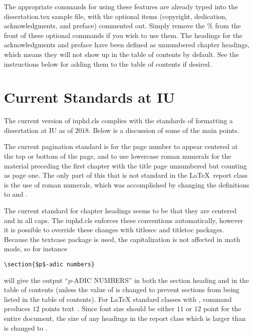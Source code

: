 The appropriate commands for using these features are already typed into the dissertation.tex sample file,
with the optional items (copyright, dedication, acknowledgments, and preface) commented out.  Simply remove the \% from the front
of these optional commands if you wish to use them.  The headings for the acknowledgments and preface have
been defined as unnumbered chapter headings, which means they will not show up in the table of contents by default.
See the instructions below for adding them to the table of contents if desired.

\section{Current Standards at IU}
The current version of iuphd.cls complies with the standards of formatting a dissertation at IU as of $2018$.  Below is a discussion of
some of the main points.

The current pagination standard is for the page number to appear centered at the top or bottom of the
page, and to use lowercase roman numerals for the material preceding the first chapter with the title page unnumbered but counting as
page one. The only part of this that is not standard in the \LaTeX \ report class is the use of roman numerals, which was accomplished
by changing the definitions to  and .

The current standard for chapter headings seems to be that they are centered and in all caps.  The iuphd.cls enforces these
conventions automatically, however it is possible to override these changes with
titlesec and titletoc packages. Because the textcase package is used,
the capitalization is not affected in math mode, so for instance
\begin{verbatim}
\section{$p$-adic numbers}
\end{verbatim}
will give the output ``$p$-ADIC NUMBERS'' in both the section heading and in the table of contents
(unless the value of  is changed to prevent sections from being listed in the table of contents).
For LaTeX standard classes with \code{[11pt]},  command produces
$12$ points text~\cite{wiki:LaTeXFonts}. Since font size should be either $11$
or $12$ point for the entire document, the size of any headings in the report class
which is larger than  is changed to .


